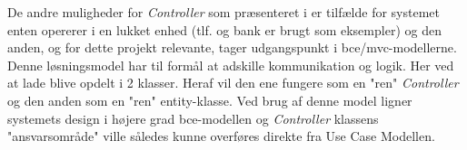 De andre muligheder for \textit{Controller} som præsenteret i \cite{umlbook} er tilfælde for systemet enten opererer i en lukket enhed (tlf. og bank er brugt som eksempler) og den anden, og for dette projekt relevante, tager udgangspunkt i bce/mvc-modellerne. Denne løsningsmodel har til formål at adskille kommunikation og logik. Her ved at lade  blive opdelt i 2 klasser. Heraf vil den ene fungere som en "ren" \textit{Controller} og den anden som en "ren" entity-klasse. Ved brug af denne model ligner systemets design i højere grad bce-modellen og \textit{Controller} klassens "ansvarsområde"  ville således kunne overføres direkte fra Use Case Modellen.        




